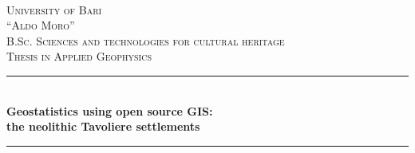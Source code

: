     \begin{titlepage}
        \newcommand{\HRule}{\rule{\linewidth}{0.5mm}} %

        \center %
         

        \textsc{
            ~\\
            ~\\
            ~\\
            ~\\
            ~\\
            ~\\
            \LARGE University of Bari\\\Large``Aldo Moro''
        }\\[1.5cm] %
        \textsc{\Large B.Sc. Sciences and technologies for cultural heritage}\\[0.5cm] %
        \textsc{\large Thesis in Applied Geophysics}\\[0.5cm] %


        \HRule \\[0.4cm]
        { \Large \bfseries Geostatistics using open source GIS:\\the neolithic Tavoliere settlements}\\[0.4cm] %
        \HRule \\[1.5cm]
         


\end{titlepage}
